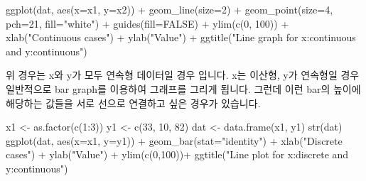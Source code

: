 \documentclass[
]{book}
\newenvironment{Shaded}{\begin{snugshade}}{\end{snugshade}}
\newcommand{\AttributeTok}[1]{\textcolor[rgb]{0.77,0.63,0.00}{#1}}
\newcommand{\ConstantTok}[1]{\textcolor[rgb]{0.00,0.00,0.00}{#1}}
\newcommand{\DecValTok}[1]{\textcolor[rgb]{0.00,0.00,0.81}{#1}}
\newcommand{\FunctionTok}[1]{\textcolor[rgb]{0.00,0.00,0.00}{#1}}
\newcommand{\NormalTok}[1]{#1}
\newcommand{\OtherTok}[1]{\textcolor[rgb]{0.56,0.35,0.01}{#1}}
\newcommand{\SpecialCharTok}[1]{\textcolor[rgb]{0.00,0.00,0.00}{#1}}
\newcommand{\StringTok}[1]{\textcolor[rgb]{0.31,0.60,0.02}{#1}}
\begin{document}
\begin{Shaded}
\begin{Highlighting}[]
\FunctionTok{ggplot}\NormalTok{(dat, }\FunctionTok{aes}\NormalTok{(}\AttributeTok{x=}\NormalTok{x1, }\AttributeTok{y=}\NormalTok{x2)) }\SpecialCharTok{+}
  \FunctionTok{geom\_line}\NormalTok{(}\AttributeTok{size=}\DecValTok{2}\NormalTok{) }\SpecialCharTok{+}
  \FunctionTok{geom\_point}\NormalTok{(}\AttributeTok{size=}\DecValTok{4}\NormalTok{, }\AttributeTok{pch=}\DecValTok{21}\NormalTok{, }\AttributeTok{fill=}\StringTok{"white"}\NormalTok{) }\SpecialCharTok{+}
  \FunctionTok{guides}\NormalTok{(}\AttributeTok{fill=}\ConstantTok{FALSE}\NormalTok{) }\SpecialCharTok{+}
  \FunctionTok{ylim}\NormalTok{(}\FunctionTok{c}\NormalTok{(}\DecValTok{0}\NormalTok{, }\DecValTok{100}\NormalTok{)) }\SpecialCharTok{+}
  \FunctionTok{xlab}\NormalTok{(}\StringTok{"Continuous cases"}\NormalTok{) }\SpecialCharTok{+} \FunctionTok{ylab}\NormalTok{(}\StringTok{"Value"}\NormalTok{) }\SpecialCharTok{+}
  \FunctionTok{ggtitle}\NormalTok{(}\StringTok{"Line graph for x:continuous and y:continuous"}\NormalTok{)}
\end{Highlighting}
\end{Shaded}

위 경우는 x와 y가 모두 연속형 데이터일 경우 입니다. x는 이산형, y가 연속형일 경우 일반적으로 bar graph를 이용하여 그래프를 그리게 됩니다. 그런데 이런 bar의 높이에 해당하는 값들을 서로 선으로 연결하고 싶은 경우가 있습니다.

\begin{Shaded}
\begin{Highlighting}[]
\NormalTok{x1 }\OtherTok{\textless{}{-}} \FunctionTok{as.factor}\NormalTok{(}\FunctionTok{c}\NormalTok{(}\DecValTok{1}\SpecialCharTok{:}\DecValTok{3}\NormalTok{))}
\NormalTok{y1 }\OtherTok{\textless{}{-}} \FunctionTok{c}\NormalTok{(}\DecValTok{33}\NormalTok{, }\DecValTok{10}\NormalTok{, }\DecValTok{82}\NormalTok{)}
\NormalTok{dat }\OtherTok{\textless{}{-}} \FunctionTok{data.frame}\NormalTok{(x1, y1)}
\FunctionTok{str}\NormalTok{(dat)}
\FunctionTok{ggplot}\NormalTok{(dat, }\FunctionTok{aes}\NormalTok{(}\AttributeTok{x=}\NormalTok{x1, }\AttributeTok{y=}\NormalTok{y1)) }\SpecialCharTok{+}
  \FunctionTok{geom\_bar}\NormalTok{(}\AttributeTok{stat=}\StringTok{"identity"}\NormalTok{) }\SpecialCharTok{+}
  \FunctionTok{xlab}\NormalTok{(}\StringTok{"Discrete cases"}\NormalTok{) }\SpecialCharTok{+} \FunctionTok{ylab}\NormalTok{(}\StringTok{"Value"}\NormalTok{) }\SpecialCharTok{+}
  \FunctionTok{ylim}\NormalTok{(}\FunctionTok{c}\NormalTok{(}\DecValTok{0}\NormalTok{,}\DecValTok{100}\NormalTok{))}\SpecialCharTok{+}
  \FunctionTok{ggtitle}\NormalTok{(}\StringTok{"Line plot for x:discrete and y:continuous"}\NormalTok{)}
\end{Highlighting}
\end{Shaded}
\end{document}
